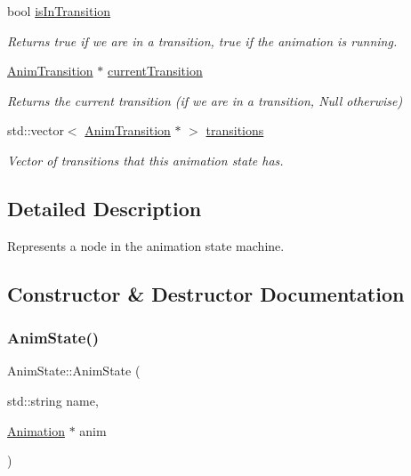 \begin{DoxyCompactItemize}
\mbox{\label{structAnimState_a8dbd55f6f675b10fe2449df761018e19}} 
bool \hyperlink{structAnimState_a8dbd55f6f675b10fe2449df761018e19}{is\+In\+Transition}
\begin{DoxyCompactList}\small\item\em Returns true if we are in a transition, true if the animation is running. \end{DoxyCompactList}\item 
\mbox{\label{structAnimState_a5836adc57bcbc24a7c43c9021afec4c0}} 
\hyperlink{structAnimTransition}{Anim\+Transition} $\ast$ \hyperlink{structAnimState_a5836adc57bcbc24a7c43c9021afec4c0}{current\+Transition}
\begin{DoxyCompactList}\small\item\em Returns the current transition (if we are in a transition, Null otherwise) \end{DoxyCompactList}\item 
\mbox{\label{structAnimState_a11936add4f5684603ddfd767749128b7}} 
std\+::vector$<$ \hyperlink{structAnimTransition}{Anim\+Transition} $\ast$ $>$ \hyperlink{structAnimState_a11936add4f5684603ddfd767749128b7}{transitions}
\begin{DoxyCompactList}\small\item\em Vector of transitions that this animation state has. \end{DoxyCompactList}\end{DoxyCompactItemize}


\subsection{Detailed Description}
Represents a node in the animation state machine. 

\subsection{Constructor \& Destructor Documentation}
\mbox{\label{structAnimState_aade1f3a6b816a8ca9848891d9907a3b0}} 
\subsubsection{\texorpdfstring{Anim\+State()}{AnimState()}}
{\footnotesize\ttfamily Anim\+State\+::\+Anim\+State (\begin{DoxyParamCaption}\item[{std\+::string}]{name,  }\item[{\hyperlink{structAnimation}{Animation} $\ast$}]{anim }\end{DoxyParamCaption})\hspace{0.3cm}{\ttfamily [inline]}}



